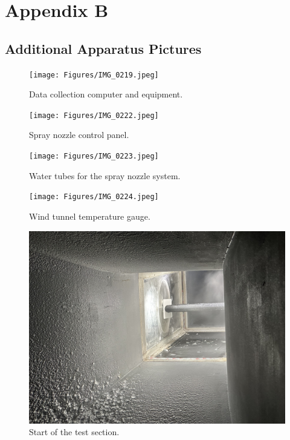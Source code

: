 \chapter{Appendix B}

\section{Additional Apparatus Pictures} \label{sec:additional_apparatus}

\begin{figure}[htpb]
    \centering
    \texttt{[image: Figures/IMG\_0219.jpeg]}
    \caption{Data collection computer and equipment.}
    \label{fig:data_collection_equipment}
\end{figure}

\begin{figure}[htpb]
    \centering
    \texttt{[image: Figures/IMG\_0222.jpeg]}
    \caption{Spray nozzle control panel.}
    \label{fig:spray_nozzle_control_panel}
\end{figure}

\begin{figure}[htpb]
    \centering
    \texttt{[image: Figures/IMG\_0223.jpeg]}
    \caption{Water tubes for the spray nozzle system.}
    \label{fig:tubes}
\end{figure}

\begin{figure}[htpb]
    \centering
    \texttt{[image: Figures/IMG\_0224.jpeg]}
    \caption{Wind tunnel temperature gauge.}
    \label{fig:temperature_gauge}
\end{figure}

\begin{figure}[htpb]
    \centering
    \includegraphics[width=\linewidth]{Figures/IMG_0230.jpeg}
    \caption{Start of the test section.}
    \label{fig:start_test_section}
\end{figure}

